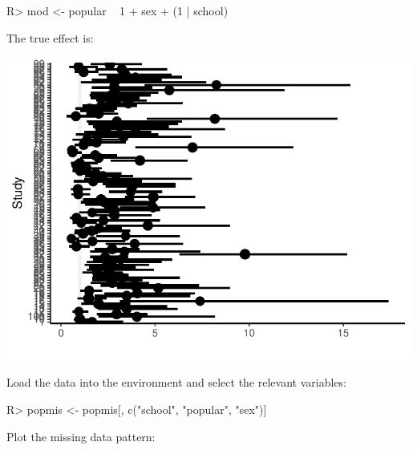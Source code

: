 \documentclass[
]{jss}
\begin{document}
\begin{CodeChunk}
\begin{CodeInput}
R> mod <- popular ~ 1 + sex + (1 | school)
\end{CodeInput}
\end{CodeChunk}

The true effect is:

\begin{CodeChunk}


\begin{center}\includegraphics{Imputation_of_Incomplete_Multilevel_Data_files/figure-latex/unnamed-chunk-3-1} \end{center}

\end{CodeChunk}

Load the data into the environment and select the relevant variables:

\begin{CodeChunk}
\begin{CodeInput}
R> popmis <- popmis[, c("school", "popular", "sex")] 
\end{CodeInput}
\end{CodeChunk}

Plot the missing data pattern:
\end{document}
